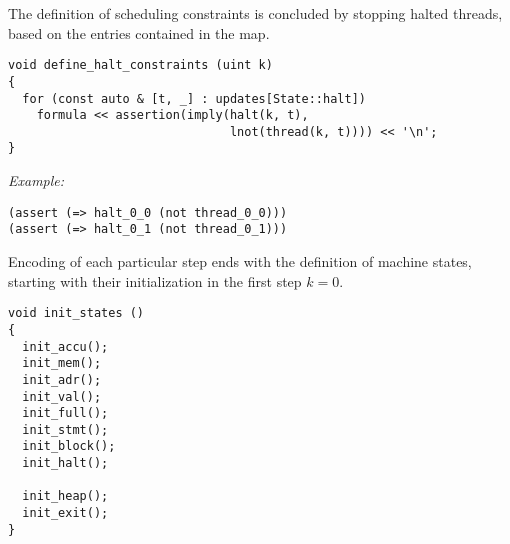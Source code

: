 
%
%

\noindent
The definition of scheduling constraints is concluded by stopping halted threads, based on the entries contained in the  map.

\begin{lstlisting}[style=c++]
void define_halt_constraints (uint k)
{
  for (const auto & [t, _] : updates[State::halt])
    formula << assertion(imply(halt(k, t),
                               lnot(thread(k, t)))) << '\n';
}
\end{lstlisting}


\noindent
\emph{Example:} 

\begin{lstlisting}[style=smtlib]
(assert (=> halt_0_0 (not thread_0_0)))
(assert (=> halt_0_1 (not thread_0_1)))
\end{lstlisting}


\noindent
Encoding of each particular step ends with the definition of machine states,
starting with their initialization in the first step $k = 0$.

\begin{lstlisting}[style=c++]
void init_states ()
{
  init_accu();
  init_mem();
  init_adr();
  init_val();
  init_full();
  init_stmt();
  init_block();
  init_halt();

  init_heap();
  init_exit();
}
\end{lstlisting}

